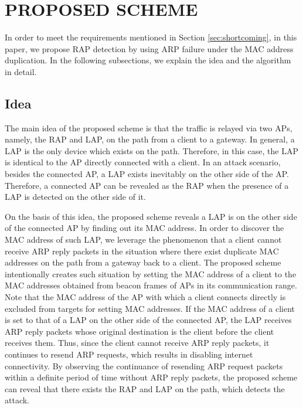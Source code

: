 \documentclass[conference]{IEEEtran}
\begin{document}
\section{PROPOSED SCHEME}\label{sec:4}
In order to meet the requirements mentioned in Section \ref{sec:shortcoming}, in this paper, we propose RAP detection by using ARP failure under the MAC address duplication.
In the following subsections, we explain the idea and the algorithm in detail.

\subsection{Idea}
The main idea of the proposed scheme is that the traffic is relayed via two APs, namely, the RAP and LAP, on the path from a client to a gateway.
In general, a LAP is the only device which exists on the path.
Therefore, in this case, the LAP is identical to the AP directly connected with a client.
In an attack scenario, besides the connected AP, a LAP exists inevitably on the other side of the AP.
Therefore, a connected AP can be revealed as the RAP when the presence of a LAP is detected on the other side of it.

On the basis of this idea, the proposed scheme reveals a LAP is on the other side of the connected AP by finding out its MAC address.
In order to discover the MAC address of such LAP, we leverage the phenomenon that a client cannot receive ARP reply packets in the situation where there exist duplicate MAC addresses on the path from a gateway back to a client.
The proposed scheme intentionally creates such situation by setting the MAC address of a client to the MAC addresses obtained from beacon frames of APs in its communication range.
Note that the MAC address of the AP with which a client connects directly is excluded from targets for setting MAC addresses.
If the MAC address of a client is set to that of a LAP on the other side of the connected AP, the LAP receives ARP reply packets whose original destination is the client before the client receives them.
Thus, since the client cannot receive ARP reply packets, it continues to resend ARP requests, which results in disabling internet connectivity.
By observing the continuance of resending ARP request packets within a definite period of time without ARP reply packets, the proposed scheme can reveal that there exists the RAP and LAP on the path, which detects the attack. %
\end{document}
